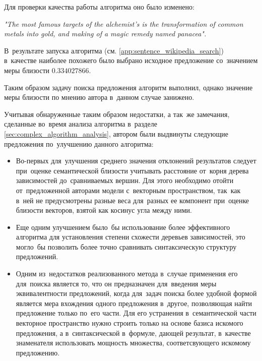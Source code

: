 Для проверки качества работы алгоритма оно было изменено:

\textit{"The most famous targets of the alchemist's is the transformation of common metals into gold, and making of a magic remedy named panacea".}

В~результате запуска алгоритма (см. \ref{app:sentence_wikipedia_search}) в~качестве наиболее похожего 
было выбрано исходное предложение со~значением меры близости $0.334027866$.

Таким образом задачу поиска предложения алгоритм выполнил, однако значение меры близости
по мнению автора в~данном случае занижено.

Учитывая обнаруженные таким образом недостатки, а так~же замечания, 
сделанные во~время анализа алгоритма в~разделе \ref{sec:complex_algorithm_analysis}, автором были
выдвинуты следующие предложения по~улучшению данного алгоритма:
\begin{itemize}
\item{
Во-первых для~улучшения среднего значения отклонений результатов следует
при~оценке семантической близости учитывать расстояние от~корня дерева зависимостей
до~сравниваемых вершин. Для этого необходимо отойти от~предложенной авторами модели с~векторным пространством,
так~как в~ней не предусмотрены разные веса для~разных ее компонент при~оценке близости векторов, взятой как косинус угла между ними.
}
\item{
Еще одним улучшением было~бы использование более эффективного алгоритма для установления
степени схожести деревьев зависимостей, это могло~бы позволить более точно сравнивать
синтаксическую структуру предложений. 
}
\item{
Одним из~недостатков реализованного метода в~случае применения его для~поиска 
является то, что он предназначен для~введения меры эквивалентности предложений, когда для~задач поиска
более удобной формой является мера вхождения одного предложения в~другое, позволяющая найти предложение только по~его части.
Для его устранения в~семантической части векторное пространство нужно строить только на основе базиса искомого предложения,
а в~синтаксической в~формуле, дающей результат, в~качестве знаменателя использовать мощность множества,
соответсвующего искомому предложению.
}
\end{itemize}


